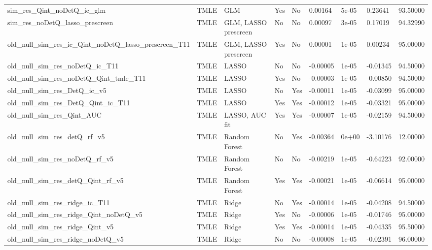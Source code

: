 \begin{longtable}[l]{lllllllll}
sim\_res\_Qint\_noDetQ\_ic\_glm & TMLE & GLM & Yes & No & 0.00164 & 5e-05 & 0.23641 & 93.50000\\
sim\_res\_noDetQ\_lasso\_prescreen & TMLE & GLM, LASSO prescreen & No & No & 0.00097 & 3e-05 & 0.17019 & 94.32990\\
old\_null\_sim\_res\_ic\_Qint\_noDetQ\_lasso\_prescreen\_T11 & TMLE & GLM, LASSO prescreen & Yes & No & 0.00001 & 1e-05 & 0.00234 & 95.00000\\
old\_null\_sim\_res\_noDetQ\_ic\_T11 & TMLE & LASSO & No & No & -0.00005 & 1e-05 & -0.01345 & 94.50000\\
old\_null\_sim\_res\_noDetQ\_Qint\_tmle\_T11 & TMLE & LASSO & Yes & No & -0.00003 & 1e-05 & -0.00850 & 94.50000\\
old\_null\_sim\_res\_DetQ\_ic\_v5 & TMLE & LASSO & No & Yes & -0.00011 & 1e-05 & -0.03099 & 95.00000\\
old\_null\_sim\_res\_DetQ\_Qint\_ic\_T11 & TMLE & LASSO & Yes & Yes & -0.00012 & 1e-05 & -0.03321 & 95.00000\\
old\_null\_sim\_res\_Qint\_AUC & TMLE & LASSO, AUC fit & Yes & Yes & -0.00007 & 1e-05 & -0.02159 & 94.50000\\
old\_null\_sim\_res\_detQ\_rf\_v5 & TMLE & Random Forest & No & Yes & -0.00364 & 0e+00 & -3.10176 & 12.00000\\
old\_null\_sim\_res\_noDetQ\_rf\_v5 & TMLE & Random Forest & No & No & -0.00219 & 1e-05 & -0.64223 & 92.00000\\
old\_null\_sim\_res\_detQ\_Qint\_rf\_v5 & TMLE & Random Forest & Yes & Yes & -0.00021 & 1e-05 & -0.06614 & 95.00000\\
old\_null\_sim\_res\_ridge\_ic\_T11 & TMLE & Ridge & No & Yes & -0.00014 & 1e-05 & -0.04208 & 94.50000\\
old\_null\_sim\_res\_ridge\_Qint\_noDetQ\_v5 & TMLE & Ridge & Yes & No & -0.00006 & 1e-05 & -0.01746 & 95.00000\\
old\_null\_sim\_res\_ridge\_Qint\_v5 & TMLE & Ridge & Yes & Yes & -0.00014 & 1e-05 & -0.04335 & 95.50000\\
old\_null\_sim\_res\_ridge\_noDetQ\_v5 & TMLE & Ridge & No & No & -0.00008 & 1e-05 & -0.02391 & 96.00000\\
\bottomrule
\end{longtable}

